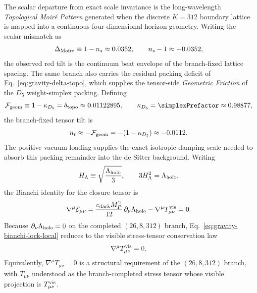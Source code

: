 \documentclass[11pt]{article}
\begin{document}
The scalar departure from exact scale invariance is the long-wavelength
\emph{Topological Moir\'e Pattern} generated when the discrete $K=312$
boundary lattice is mapped into a continuous four-dimensional horizon
geometry. Writing the scalar mismatch as
\begin{equation}
\label{eq:gravity-moire-scalar}
 \Delta_{\rm Moire}
 \equiv
 1-n_s
 \approx
 0.0352,
 \qquad
 n_s-1\approx -0.0352,
\end{equation}
the observed red tilt is the continuum beat envelope of the branch-fixed
lattice spacing. The same branch also carries the residual packing deficit of
Eq.~\eqref{eq:gravity-delta-topo}, which supplies the tensor-side
\emph{Geometric Friction} of the $D_5$ weight-simplex packing. Defining
\begin{equation}
\label{eq:gravity-geometric-friction}
 \mathcal F_{\rm geom}
 \equiv
 1-\kappa_{D_5}
 =
 \delta_{\rm topo}
 \approx
 0.01122895,
 \qquad
 \kappa_{D_5}=\simplexPrefactor\approx 0.98877,
\end{equation}
the branch-fixed tensor tilt is
\begin{equation}
\label{eq:gravity-tensor-friction}
 n_t\approx -\mathcal F_{\rm geom}=-(1-\kappa_{D_5})\approx -0.0112.
\end{equation}
The positive vacuum loading supplies the exact isotropic damping scale needed
to absorb this packing remainder into the de Sitter background. Writing
\begin{equation}
\label{eq:gravity-hubble-scale}
 H_{\Lambda}\equiv \sqrt{\frac{\Lambda_{\rm holo}}{3}},
 \qquad
 3H_{\Lambda}^2=\Lambda_{\rm holo},
\end{equation}
the Bianchi identity for the closure tensor is
\begin{equation}
\label{eq:gravity-bianchi-lock-local}
 \nabla^{\mu}\mathcal E_{\mu\nu}
 =
 \frac{c_{\rm dark}M_P^2}{12}\,\partial_{\nu}\Lambda_{\rm holo}
 -\nabla^{\mu}T^{\rm vis}_{\mu\nu}
 =0.
\end{equation}
Because $\partial_{\nu}\Lambda_{\rm holo}=0$ on the completed $(26,8,312)$
branch, Eq.~\eqref{eq:gravity-bianchi-lock-local} reduces to the visible
stress-tensor conservation law
\begin{equation}
\label{eq:gravity-visible-stress-conservation}
 \nabla^{\mu}T^{\rm vis}_{\mu\nu}=0.
\end{equation}
Equivalently, $\nabla^{\mu}T_{\mu\nu}=0$ is a structural requirement of the
$(26,8,312)$ branch, with $T_{\mu\nu}$ understood as the branch-completed
stress tensor whose visible projection is $T^{\rm vis}_{\mu\nu}$.
\end{document}
